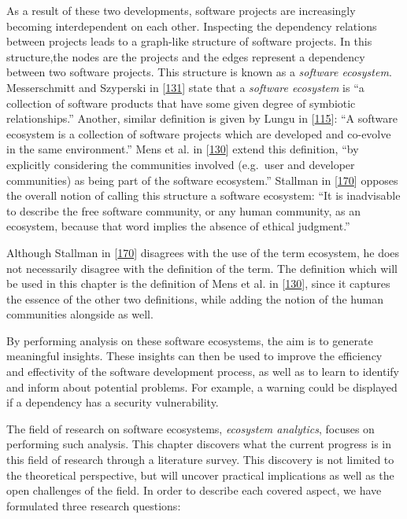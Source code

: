 \documentclass[]{book}
\begin{document}
As a result of these two developments, software projects are
increasingly becoming interdependent on each other. Inspecting the
dependency relations between projects leads to a graph-like structure of
software projects. In this structure,the nodes are the projects and the
edges represent a dependency between two software projects. This
structure is known as a \emph{software ecosystem}. Messerschmitt and
Szyperski in {[}\protect\hyperlink{ref-Messerschmitt2003}{131}{]} state
that a \emph{software ecosystem} is ``a collection of software products
that have some given degree of symbiotic relationships.'' Another,
similar definition is given by Lungu in
{[}\protect\hyperlink{ref-Lungu2009}{115}{]}: ``A software ecosystem is
a collection of software projects which are developed and co-evolve in
the same environment.'' Mens et al. in
{[}\protect\hyperlink{ref-Mens2013}{130}{]} extend this definition, ``by
explicitly considering the communities involved (e.g.~user and developer
communities) as being part of the software ecosystem.'' Stallman in
{[}\protect\hyperlink{ref-Stallman2002}{170}{]} opposes the overall
notion of calling this structure a software ecosystem: ``It is
inadvisable to describe the free software community, or any human
community, as an ecosystem, because that word implies the absence of
ethical judgment.''

Although Stallman in {[}\protect\hyperlink{ref-Stallman2002}{170}{]}
disagrees with the use of the term ecosystem, he does not necessarily
disagree with the definition of the term. The definition which will be
used in this chapter is the definition of Mens et al. in
{[}\protect\hyperlink{ref-Mens2013}{130}{]}, since it captures the
essence of the other two definitions, while adding the notion of the
human communities alongside as well.

By performing analysis on these software ecosystems, the aim is to
generate meaningful insights. These insights can then be used to improve
the efficiency and effectivity of the software development process, as
well as to learn to identify and inform about potential problems. For
example, a warning could be displayed if a dependency has a security
vulnerability.

The field of research on software ecosystems, \emph{ecosystem
analytics}, focuses on performing such analysis. This chapter discovers
what the current progress is in this field of research through a
literature survey. This discovery is not limited to the theoretical
perspective, but will uncover practical implications as well as the open
challenges of the field. In order to describe each covered aspect, we
have formulated three research questions:
\end{document}
